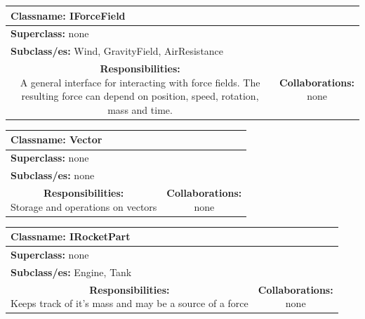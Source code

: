 \documentclass{article}
\begin{document}
\begin {center}
\begin{tabular}{|c|c|}
\hline
\multicolumn{2}{|l|}{\textbf{Classname:} IForceField}\\
\hline
\multicolumn{2}{|l|}{\textbf{Superclass:} none}\\
\multicolumn{2}{|l|}{\textbf{Subclass/es:} Wind, GravityField, AirResistance}\\
\hline
\parbox[]{5cm}{\vspace{3px}\textbf{Responsibilities:} \\A general interface for interacting with force fields. The resulting force can depend on position, speed, rotation, mass and time.\vspace{3px}} & \parbox[]{5cm}{\textbf{Collaborations:}\\none}\\
\hline
 \end{tabular}\vspace{.4cm}

\begin{tabular}{|c|c|}
\hline
\multicolumn{2}{|l|}{\textbf{Classname:} Vector}\\
\hline
\multicolumn{2}{|l|}{\textbf{Superclass:} none}\\
\multicolumn{2}{|l|}{\textbf{Subclass/es:} none}\\
\hline
\parbox[]{5cm}{\vspace{3px}\textbf{Responsibilities:} \\Storage and operations on vectors\vspace{3px}} & \parbox[]{5cm}{\textbf{Collaborations:}\\none}\\
\hline
 \end{tabular}\vspace{.4cm}

\begin{tabular}{|c|c|}
\hline
\multicolumn{2}{|l|}{\textbf{Classname:} IRocketPart}\\
\hline
\multicolumn{2}{|l|}{\textbf{Superclass:} none}\\
\multicolumn{2}{|l|}{\textbf{Subclass/es:} Engine, Tank}\\
\hline
\parbox[]{5cm}{\vspace{3px}\textbf{Responsibilities:} \\Keeps track of it's mass and may be a source of a force\vspace{3px}} & \parbox[]{5cm}{\textbf{Collaborations:}\\none}\\
\hline
 \end{tabular}\vspace{.4cm}


\end{center}
\end{document}
